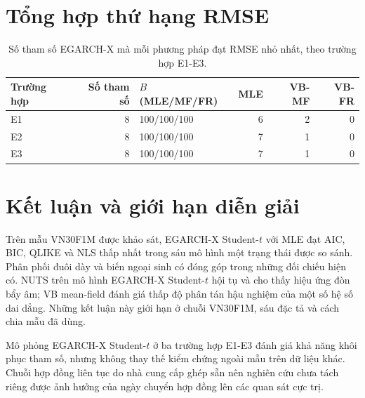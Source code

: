 \documentclass[11pt,a4paper]{article}
\begin{document}
\section{Tổng hợp thứ hạng RMSE}
\begin{table}[H]\centering\normalsize
\caption{Số tham số EGARCH-X mà mỗi phương pháp đạt RMSE nhỏ nhất, theo trường hợp E1-E3.}\label{tab:dem-thang}
\begin{tabular}{l r l r r r}
\toprule
\textbf{Trường hợp} & \textbf{Số tham số} & $B$ (MLE/MF/FR) & \textbf{MLE} & \textbf{VB-MF} & \textbf{VB-FR} \\
\midrule
E1 & 8 & 100/100/100 & 6 & 2 & 0 \\
E2 & 8 & 100/100/100 & 7 & 1 & 0 \\
E3 & 8 & 100/100/100 & 7 & 1 & 0 \\
\bottomrule
\end{tabular}
\end{table}


\section{Kết luận và giới hạn diễn giải}
Trên mẫu VN30F1M được khảo sát, EGARCH-X Student-$t$ với MLE đạt AIC,
BIC, QLIKE và NLS thấp nhất trong sáu mô hình một trạng thái được so sánh.
Phân phối đuôi dày và biến ngoại sinh có đóng góp trong những đối chiếu
hiện có. NUTS trên mô hình EGARCH-X Student-$t$
hội tụ và cho thấy hiệu ứng đòn bẩy âm; VB mean-field đánh giá thấp độ phân
tán hậu nghiệm của một số hệ số dai dẳng. Những kết luận này giới hạn ở
chuỗi VN30F1M, sáu đặc tả và cách chia mẫu đã dùng.

Mô phỏng EGARCH-X Student-$t$ ở ba trường hợp E1-E3 đánh giá khả năng khôi
phục tham số, nhưng không thay thế kiểm chứng ngoài mẫu trên dữ liệu khác.
Chuỗi hợp đồng liên tục do nhà cung cấp ghép sẵn nên nghiên cứu chưa tách
riêng được ảnh hưởng của ngày chuyển hợp đồng lên các quan sát cực trị.
\end{document}
